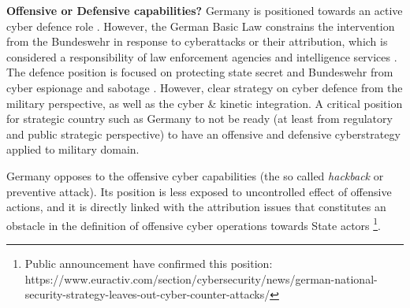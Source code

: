 \textbf{Offensive or Defensive capabilities?} Germany is positioned towards an active cyber defence role \autocite{federalministryoftheinteriorbuildingandcommunity_2021_cyber}. However, the German Basic Law constrains the intervention from the Bundeswehr in response to cyberattacks or their attribution, which is considered a responsibility of law enforcement agencies and intelligence services \autocite{leinhos_2020_cyber}. The defence position is focused on protecting state secret and Bundeswehr from cyber espionage and sabotage \autocite{federalministryoftheinteriorbuildingandcommunity_2021_cyber, thefederalgovernmentofgermany_2023_robust}. However, clear strategy on cyber defence from the military perspective, as well as the cyber \& kinetic integration. A critical position for strategic country such as Germany to not be ready (at least from regulatory and public strategic perspective) to have an offensive and defensive cyberstrategy applied to military domain. 

Germany opposes to the offensive cyber capabilities (the so called \textit{hackback} or preventive attack). Its position is less exposed to uncontrolled effect of offensive actions, and it is directly linked with the attribution issues that constitutes an obstacle in the definition of offensive cyber operations towards State actors \footnote{Public announcement have confirmed this position: https://www.euractiv.com/section/cybersecurity/news/german-national-security-strategy-leaves-out-cyber-counter-attacks/}.

